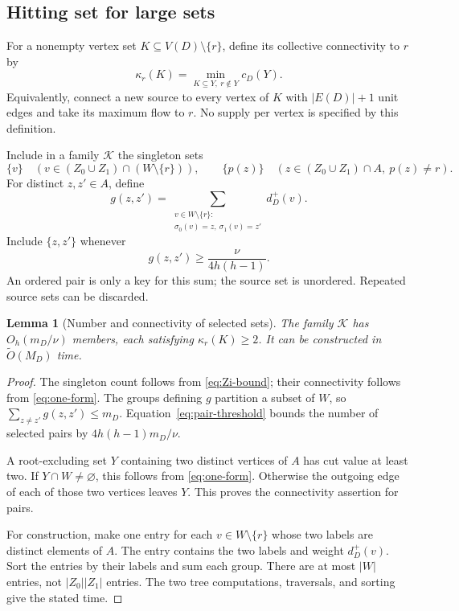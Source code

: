 \documentclass[11pt]{article}
\newtheorem{lemma}[theorem]{Lemma}
\theoremstyle{definition}
\theoremstyle{remark}
\newcommand{\OO}{\widetilde O}
\begin{document}
\subsection{Hitting set for large sets}
For a nonempty vertex set \(K\subseteq V(D)\setminus\{r\}\), define its collective connectivity to \(r\) by
\begin{equation}
 \kappa_r(K)=\min_{K\subseteq Y,\ r\notin Y}c_D(Y).
 \label{eq:kappa}
\end{equation}
Equivalently, connect a new source to every vertex of \(K\) with \(|E(D)|+1\) unit edges and take its maximum flow to \(r\). No supply per vertex is specified by this definition.

Include in a family \(\mathcal K\) the singleton sets
\begin{equation}
 \{v\}\quad(v\in(Z_0\cup Z_1)\cap(W\setminus\{r\})),
 \qquad
 \{p(z)\}\quad(z\in(Z_0\cup Z_1)\cap A,\ p(z)\ne r).
 \label{eq:singletons}
\end{equation}
For distinct \(z,z'\in A\), define
\[
 g(z,z')=\sum_{\substack{v\in W\setminus\{r\}:\\
                \sigma_0(v)=z,\ \sigma_1(v)=z'}}d_D^+(v).
\]
Include \(\{z,z'\}\) whenever
\begin{equation}
 g(z,z')\ge\frac{\nu}{4h(h-1)}.
 \label{eq:pair-threshold}
\end{equation}
An ordered pair is only a key for this sum; the source set is unordered. Repeated source sets can be discarded.

\begin{lemma}[Number and connectivity of selected sets]
\label{lem:slow-family}
The family \(\mathcal K\) has \(O_h(m_D/\nu)\) members, each satisfying \(\kappa_r(K)\ge2\). It can be constructed in \(\OO(M_D)\) time.
\end{lemma}
\begin{proof}
The singleton count follows from \eqref{eq:Zi-bound}; their connectivity follows from \eqref{eq:one-form}. The groups defining \(g\) partition a subset of \(W\), so \(\sum_{z\ne z'}g(z,z')\le m_D\). Equation~\eqref{eq:pair-threshold} bounds the number of selected pairs by \(4h(h-1)m_D/\nu\).

A root-excluding set \(Y\) containing two distinct vertices of \(A\) has cut value at least two. If \(Y\cap W\ne\varnothing\), this follows from \eqref{eq:one-form}. Otherwise the outgoing edge of each of those two vertices leaves \(Y\). This proves the connectivity assertion for pairs.

For construction, make one entry for each \(v\in W\setminus\{r\}\) whose two labels are distinct elements of \(A\). The entry contains the two labels and weight \(d_D^+(v)\). Sort the entries by their labels and sum each group. There are at most \(|W|\) entries, not \(|Z_0||Z_1|\) entries. The two tree computations, traversals, and sorting give the stated time.
\end{proof}
\end{document}
